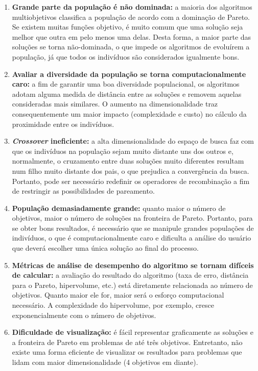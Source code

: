 \begin{enumerate}  
	\item \textbf{Grande parte da população é não dominada:} a maioria dos algoritmos multiobjetivos classifica a população de acordo com a dominação de Pareto. Se existem muitas funções objetivo, é muito comum que uma solução seja melhor que outra em pelo menos uma delas. Desta forma, a maior parte das soluções se torna não-dominada, o que impede os algoritmos de evoluírem a população, já que todos os indivíduos são considerados igualmente bons.
	\item \textbf{Avaliar a diversidade da população se torna computacionalmente caro:} a fim de garantir uma boa diversidade populacional, os algoritmos adotam alguma medida de distância entre as soluções e removem aquelas consideradas mais similares. O aumento na dimensionalidade traz consequentemente um maior impacto (complexidade e custo) no cálculo da proximidade entre os indivíduos. 
	\item \textbf{\textit{Crossover} ineficiente:} a alta dimensionalidade do espaço de busca faz com que os indivíduos na população sejam muito distante uns dos outros e, normalmente, o cruzamento entre duas soluções muito diferentes resultam num filho muito distante dos pais, o que prejudica a convergência da busca. Portanto, pode ser necessário redefinir os operadores de recombinação a fim de restringir as possibilidades de pareamento.
	\item \textbf{População demasiadamente grande:} quanto maior o número de objetivos, maior o número de soluções na fronteira de Pareto. Portanto, para se obter bons resultados, é necessário que se manipule grandes populações de indivíduos, o que é computacionalmente caro e dificulta a análise do usuário que deverá escolher uma única solução ao final do processo.
	\item \textbf{Métricas de análise de desempenho do algoritmo se tornam difíceis de calcular:} a avaliação do resultado do algoritmo (taxa de erro, distância para o Pareto, hipervolume, etc.) está diretamente relacionada ao número de objetivos. Quanto maior ele for, maior será o esforço computacional necessário. A complexidade do hipervolume, por exemplo, cresce exponencialmente com o número de objetivos.
	\item \textbf{Dificuldade de visualização:} é fácil representar graficamente as soluções e a fronteira de Pareto em problemas de até três objetivos. Entretanto, não existe uma forma eficiente de visualizar os resultados para problemas que lidam com maior dimensionalidade (4 objetivos em diante).
\end{enumerate}

